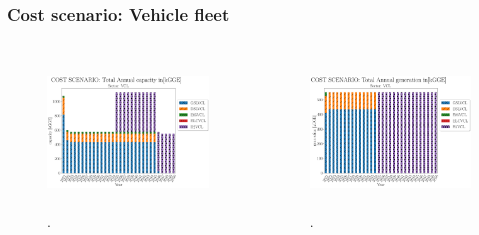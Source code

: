 \begin{frame}
  \frametitle{Cost scenario: Vehicle fleet}
  \begin{columns}
    \column[t]{5cm}
      \begin{figure}[htbp!]
          \begin{center}
            \includegraphics[height=4cm]{./images/cost scenario_vcl_capacity.png}
          \end{center}
          \caption{.}
          \label{fig:cost-vcl-cap}
      \end{figure}
    \column[t]{5cm}
        \begin{figure}[htbp!]
          \begin{center}
            \includegraphics[height=4cm]{./images/cost scenario_vcl_generation.png}
          \end{center}
          \caption{.}
          \label{fig:cost-vcl-gen}
        \end{figure}
    \end{columns}
\end{frame}
